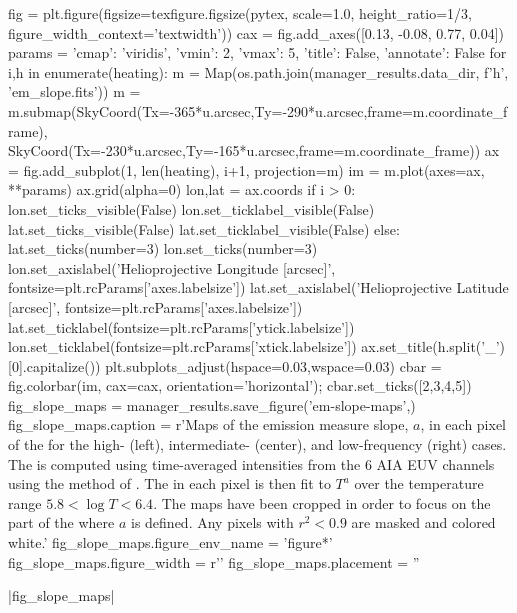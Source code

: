 \begin{pycode}
fig = plt.figure(figsize=texfigure.figsize(pytex, scale=1.0, height_ratio=1/3,
                                           figure_width_context='textwidth'))
cax = fig.add_axes([0.13, -0.08, 0.77, 0.04])
params = {'cmap': 'viridis', 'vmin': 2, 'vmax': 5, 'title': False, 'annotate': False}
for i,h in enumerate(heating):
    m = Map(os.path.join(manager_results.data_dir, f'{h}', 'em_slope.fits'))
    m = m.submap(SkyCoord(Tx=-365*u.arcsec,Ty=-290*u.arcsec,frame=m.coordinate_frame),
                 SkyCoord(Tx=-230*u.arcsec,Ty=-165*u.arcsec,frame=m.coordinate_frame))
    ax = fig.add_subplot(1, len(heating), i+1, projection=m)
    im = m.plot(axes=ax, **params)
    ax.grid(alpha=0)
    lon,lat = ax.coords
    if i > 0:
        lon.set_ticks_visible(False)
        lon.set_ticklabel_visible(False)
        lat.set_ticks_visible(False)
        lat.set_ticklabel_visible(False)
    else:
        lat.set_ticks(number=3)
        lon.set_ticks(number=3)
        lon.set_axislabel('Helioprojective Longitude [arcsec]',
                          fontsize=plt.rcParams['axes.labelsize'])
        lat.set_axislabel('Helioprojective Latitude [arcsec]',
                          fontsize=plt.rcParams['axes.labelsize'])
        lat.set_ticklabel(fontsize=plt.rcParams['ytick.labelsize'])
        lon.set_ticklabel(fontsize=plt.rcParams['xtick.labelsize'])
    ax.set_title(h.split('_')[0].capitalize())
plt.subplots_adjust(hspace=0.03,wspace=0.03)
cbar = fig.colorbar(im, cax=cax, orientation='horizontal');
cbar.set_ticks([2,3,4,5])
fig_slope_maps = manager_results.save_figure('em-slope-maps',)
fig_slope_maps.caption = r'Maps of the emission measure slope, $a$, in each pixel of the \AR{} for the high- (left), intermediate- (center), and low-frequency (right) cases. The \dem{} is computed using time-averaged intensities from the 6 AIA EUV channels using the method of \citet{hannah_differential_2012}. The \dem{} in each pixel is then fit to $T^a$ over the temperature range $5.8<\log{T}<6.4$. The maps have been cropped in order to focus on the part of the \AR{} where $a$ is defined. Any pixels with $r^2<0.9$ are masked and colored white.'
fig_slope_maps.figure_env_name = 'figure*'
fig_slope_maps.figure_width = r'\textwidth'
fig_slope_maps.placement = ''
\end{pycode}
|fig_slope_maps|

